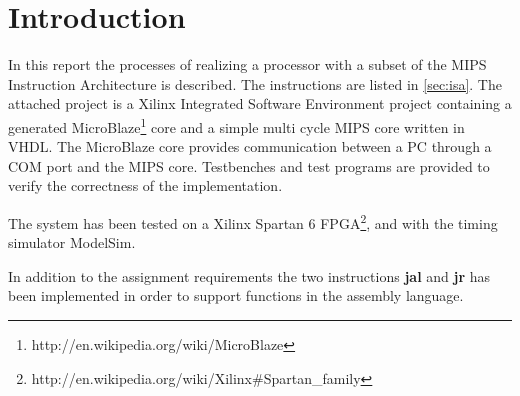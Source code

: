 \section{Introduction}

In this report the processes of realizing a processor with a subset of 
the MIPS Instruction Architecture is described. The instructions are listed 
in \ref{sec:isa}. The attached project is a Xilinx Integrated Software Environment 
project containing a generated MicroBlaze\footnote{http://en.wikipedia.org/wiki/MicroBlaze} 
core and a simple multi cycle MIPS core written in VHDL. The MicroBlaze core provides 
communication between a PC through a COM port and the MIPS core. Testbenches and 
test programs are provided to verify the correctness of the implementation. 

The system has been tested on a Xilinx Spartan 6 FPGA\footnote{http://en.wikipedia.org/wiki/Xilinx\#Spartan\_family}, 
and with the timing simulator ModelSim.

In addition to the assignment requirements the two instructions {\bf jal} and {\bf jr} has been implemented in 
order to support functions in the assembly language. 
